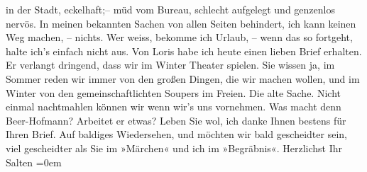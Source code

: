 \begin{ledgroupsized}[t]{13cm}
               in der Stadt, eckelhaft;– müd vom Bureau, schlecht aufgelegt und genzenlos
               nervös.\pend
           \pstart
           In meinen bekannten Sachen von {\pb}allen Seiten behindert,
               ich kann keinen Weg machen, – nichts. Wer weiss, bekomme ich Urlaub, – wenn das so
               fortgeht, halte ich’s einfach nicht aus.\pend
           \pstart
           Von Loris habe ich heute einen lieben Brief erhalten.
               Er verlangt dringend, dass wir im Winter Theater spielen. Sie wissen ja, im Sommer
               reden wir immer von den großen Dingen, die wir machen wollen, und im Winter von den
               gemeinschaftlichten Soupers im Freien. Die alte Sache. Nicht einmal nachtmahlen
               können wir wenn wir’s uns vornehmen. Was macht denn Beer-Hofmann? Arbeitet er etwas? \pend
           \pstart
           Leben Sie wol, ich danke Ihnen bestens für Ihren Brief. Auf baldiges Wiedersehen, und
               möchten wir bald gescheidter sein, viel gescheidter als Sie im »Märchen« und ich im »Begräbnis«.\pend
           \pstart
           Herzlichst Ihr{\\[\baselineskip]}\spacefill\mbox{Salten}\pend
           \leftskip=0em{}
         
         \endnumbering{}\end{ledgroupsized}\begin{anhang}\end{anhang}\newcommand{\dateiname}{L03123}\newcommand{\titel}{Felix Salten an Arthur Schnitzler, 6. 7. 1893}\newcommand{\editorInnen}{Martin Anton Müller und Laura Untner}
      